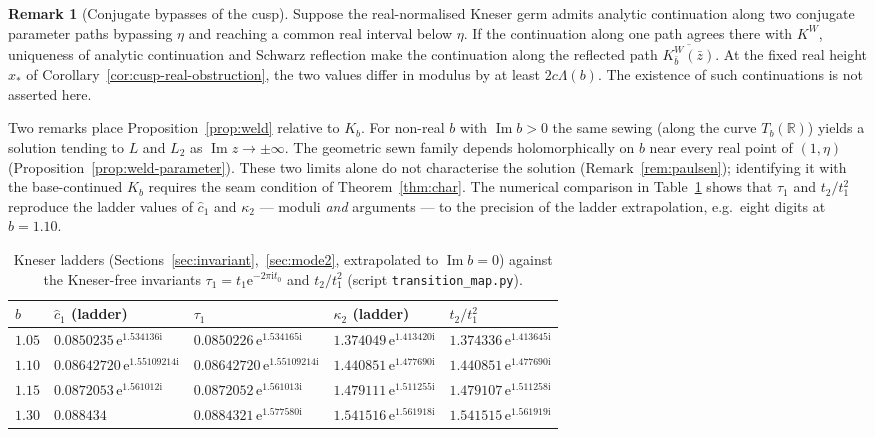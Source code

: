 \documentclass[11pt,a4paper]{article}
\theoremstyle{definition}
\newtheorem{remark}[theorem]{Remark}
\newcommand{\Kk}{K}
\newcommand{\eee}{\mathrm{e}}
\newcommand{\ii}{\mathrm{i}}
\begin{document}
\begin{remark}[Conjugate bypasses of the cusp]
Suppose the real-normalised Kneser germ admits analytic continuation
along two conjugate parameter paths bypassing $\eta$ and reaching a
common real interval below $\eta$.  If the continuation along one path
agrees there with $\Kk^W$, uniqueness of analytic continuation and
Schwarz reflection make the continuation along the reflected path
$\overline{\Kk^W_{\bar b}(\bar z)}$.  At the fixed real height $x_*$ of
Corollary~\ref{cor:cusp-real-obstruction}, the two values differ in
modulus by at least $2c\Lambda(b)$.  The existence of such
continuations is not asserted here.
\end{remark}

Two remarks place Proposition~\ref{prop:weld} relative to $\Kk_b$.  For
non-real $b$ with $\operatorname{Im}b>0$ the same sewing (along the curve
$T_b(\mathbb R)$) yields a solution tending to $L$ and $L_2$ as
$\operatorname{Im}z\to\pm\infty$.  The geometric sewn family depends
holomorphically on $b$ near every real point of $(1,\eta)$
(Proposition~\ref{prop:weld-parameter}).  These two limits alone do not
characterise the solution (Remark~\ref{rem:paulsen}); identifying it with
the base-continued $\Kk_b$ requires the seam condition of
Theorem~\ref{thm:char}.  The numerical comparison in Table~\ref{tab:tau}
shows that $\tau_1$ and $t_2/t_1^2$ reproduce the ladder
values of $\hat c_1$ and $\kappa_2$ --- moduli \emph{and} arguments --- to the
precision of the ladder extrapolation, e.g.\ eight digits at $b=1.10$.

\begin{table}[htbp]
\centering
\caption{Kneser ladders (Sections~\ref{sec:invariant},~\ref{sec:mode2}, extrapolated
to $\operatorname{Im}b=0$) against the Kneser-free invariants
$\tau_1=t_1\eee^{-2\pi\ii t_0}$ and $t_2/t_1^2$ (script \texttt{transition\_map.py}).}
\label{tab:tau}
\small\setlength{\tabcolsep}{3.5pt}
\begin{tabular}{lllll}
\toprule
$b$ & $\hat c_1$ (ladder) & $\tau_1$ & $\kappa_2$ (ladder) & $t_2/t_1^2$\\
\midrule
$1.05$ & $0.0850235\,\eee^{1.534136\ii}$ & $0.0850226\,\eee^{1.534165\ii}$ & $1.374049\,\eee^{1.413420\ii}$ & $1.374336\,\eee^{1.413645\ii}$\\
$1.10$ & $0.08642720\,\eee^{1.55109214\ii}$ & $0.08642720\,\eee^{1.55109214\ii}$ & $1.440851\,\eee^{1.477690\ii}$ & $1.440851\,\eee^{1.477690\ii}$\\
$1.15$ & $0.0872053\,\eee^{1.561012\ii}$ & $0.0872052\,\eee^{1.561013\ii}$ & $1.479111\,\eee^{1.511255\ii}$ & $1.479107\,\eee^{1.511258\ii}$\\
$1.30$ & $0.088434$ & $0.0884321\,\eee^{1.577580\ii}$ & $1.541516\,\eee^{1.561918\ii}$ & $1.541515\,\eee^{1.561919\ii}$\\
\bottomrule
\end{tabular}
\end{table}
\end{document}
